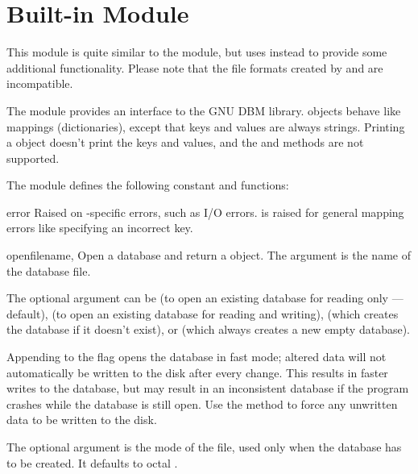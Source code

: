 \section{Built-in Module }
\label{module-gdbm}

%
%

This module is quite similar to the  module, but uses 
instead to provide some additional functionality.  Please note that
the file formats created by  and  are incompatible.

The  module provides an interface to the GNU DBM
library.   objects behave like mappings
(dictionaries), except that keys and values are always strings.
Printing a  object doesn't print the keys and values, and the
 and  methods are not supported.

The module defines the following constant and functions:

\begin{excdesc}{error}
Raised on -specific errors, such as I/O errors.  is
raised for general mapping errors like specifying an incorrect key.
\end{excdesc}

\begin{funcdesc}{open}{filename, }
Open a  database and return a  object.  The
 argument is the name of the database file.

The optional  argument can be
 (to open an existing database for reading only --- default),
 (to open an existing database for reading and writing),
 (which creates the database if it doesn't exist), or
 (which always creates a new empty database).

Appending  to the flag opens the database in fast mode;
altered data will not automatically be written to the disk after every
change.  This results in faster writes to the database, but may result
in an inconsistent database if the program crashes while the database
is still open.  Use the  method to force any unwritten
data to be written to the disk.

The optional  argument is the \UNIX{} mode of the file, used
only when the database has to be created.  It defaults to octal
.
\end{funcdesc}

